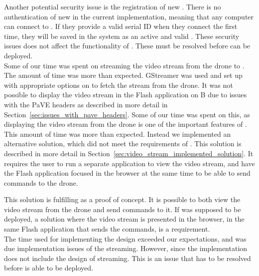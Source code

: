 Another potential security issue is the registration of new .
There is no authentication of new  in the current implementation, meaning that any computer can connect to .
If they provide a valid serial ID when they connect the first time, they will be saved in the system as an active and valid .
These security issues does not affect the functionality of \projectname{}.
These must be resolved before \projectname{} can be deployed. \\

Some of our time was spent on streaming the video stream from the drone to .
The amount of time was more than expected.
GStreamer was used and set up with appropriate options on  to fetch the stream from the drone.
It was not possible to display the video stream in the Flash application on B due to issues with the PaVE headers as described in more detail in Section~\ref{sec:issues_with_pave_headers}.
Some of our time was spent on this, as displaying the video stream from the drone is one of the important features of \projectname{}.
This amount of time was more than expected.
Instead we implemented an alternative solution, which did not meet the requirements of \projectname{}.
This solution is described in more detail in Section~\ref{sec:video_stream_implemented_solution}.
It requires the user to run a separate application to view the video stream, and have the Flash application focused in the browser at the same time to be able to send commands to the drone.

This solution is fulfilling as a proof of concept.
It is possible to both view the video stream from the drone and send commands to it.
If \projectname{} was supposed to be deployed, a solution where the video stream is presented in the browser, in the same Flash application that sends the commands, is a requirement. \\

The time used for implementing the design exceeded our expectations, and was due implementation issues of the streaming.
However, since the implementation does not include the design of streaming.
This is an issue that has to be resolved before \projectname{} is able to be deployed.


